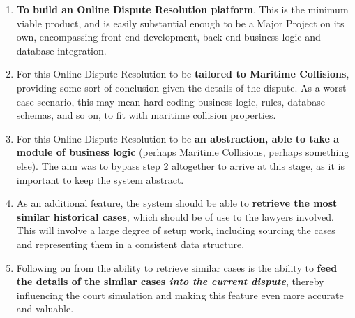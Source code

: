 \begin{enumerate}

    \item \textbf{To build an Online Dispute Resolution platform}. This is the minimum viable product, and is easily substantial enough to be a Major Project on its own, encompassing front-end development, back-end business logic and database integration.
    
    \item For this Online Dispute Resolution to be \textbf{tailored to Maritime Collisions}, providing some sort of conclusion given the details of the dispute. As a worst-case scenario, this may mean hard-coding business logic, rules, database schemas, and so on, to fit with maritime collision properties.

    \item For this Online Dispute Resolution to be \textbf{an abstraction, able to take a module of business logic} (perhaps Maritime Collisions, perhaps something else). The aim was to bypass step 2 altogether to arrive at this stage, as it is important to keep the system abstract.

    \item As an additional feature, the system should be able to \textbf{retrieve the most similar historical cases}, which should be of use to the lawyers involved. This will involve a large degree of setup work, including sourcing the cases and representing them in a consistent data structure.

    \item Following on from the ability to retrieve similar cases is the ability to \textbf{feed the details of the similar cases \emph{into the current dispute}}, thereby influencing the court simulation and making this feature even more accurate and valuable.

\end{enumerate}